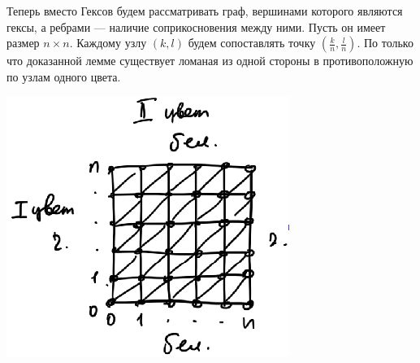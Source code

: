 \documentclass{article}
\begin{document}
Теперь вместо Гексов будем рассматривать граф, вершинами которого являются гексы, а ребрами --- наличие соприкосновения между ними. Пусть он имеет размер $n \times n$.
Каждому узлу $(k, l)$ будем сопоставлять точку $\left(\frac{k}{n}, \frac{l}{n}\right)$. По только что доказанной лемме существует ломаная из одной стороны в противоположную по узлам одного цвета.

\begin{center}
    \includegraphics[scale=0.44]{../images/Brauer's_th2.png}
\end{center}
\end{document}
